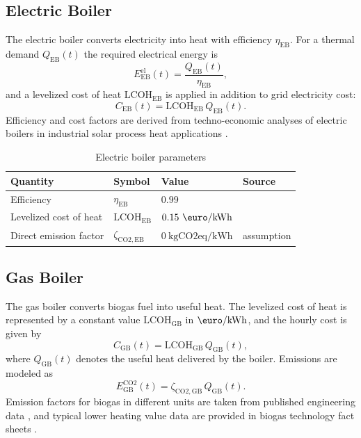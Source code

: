 \documentclass[12pt,a4paper]{report}
\begin{document}
\subsection{Electric Boiler}
\label{subsec:electric_boiler}

The electric boiler converts electricity into heat with efficiency \(\eta_{\mathrm{EB}}\). For a thermal demand \(Q_{\mathrm{EB}}(t)\) the required electrical energy is
\begin{equation}
E_{\mathrm{EB}}^{\mathrm{el}}(t) = \frac{Q_{\mathrm{EB}}(t)}{\eta_{\mathrm{EB}}},
\label{eq:electric_boiler_power}
\end{equation}
and a levelized cost of heat \(\mathrm{LCOH}_{\mathrm{EB}}\) is applied in addition to grid electricity cost:
\begin{equation}
C_{\mathrm{EB}}(t) = \mathrm{LCOH}_{\mathrm{EB}}\,Q_{\mathrm{EB}}(t).
\label{eq:electric_boiler_cost}
\end{equation}
Efficiency and cost factors are derived from techno-economic analyses of electric boilers in industrial solar process heat applications \cite{caron_ship4d_2025}.  

\begin{table}[H]
\centering
\caption{Electric boiler parameters}
\label{tab:electric_boiler_parameters}
\begin{tabular}{llll}
\hline
Quantity & Symbol & Value & Source \\
\hline
Efficiency & \(\eta_{\mathrm{EB}}\) & \(0.99\) & \cite{caron_ship4d_2025} \\
Levelized cost of heat & \(\mathrm{LCOH}_{\mathrm{EB}}\) & \(0.15~\mathrm{\text{\euro}/kWh}\) & \cite{caron_ship4d_2025} \\
Direct emission factor & \(\zeta_{\mathrm{CO2,EB}}\) & \(0~\mathrm{kgCO2eq/kWh}\) & assumption \\
\hline
\end{tabular}
\end{table}

\subsection{Gas Boiler}
\label{subsec:gas_boiler}

The gas boiler converts biogas fuel into useful heat. The levelized cost of heat is represented by a constant value \(\mathrm{LCOH}_{\mathrm{GB}}\) in \(\mathrm{\text{\euro}/kWh}\), and the hourly cost is given by
\begin{equation}
C_{\mathrm{GB}}(t) = \mathrm{LCOH}_{\mathrm{GB}}\,Q_{\mathrm{GB}}(t),
\label{eq:gas_boiler_cost}
\end{equation}
where \(Q_{\mathrm{GB}}(t)\) denotes the useful heat delivered by the boiler. Emissions are modeled as
\begin{equation}
E_{\mathrm{GB}}^{\mathrm{CO2}}(t) = \zeta_{\mathrm{CO2,GB}}\,Q_{\mathrm{GB}}(t).
\label{eq:gas_boiler_emissions}
\end{equation}
Emission factors for biogas in different units are taken from published engineering data \cite{winnipeg_biogas_2012}, and typical lower heating value data are provided in biogas technology fact sheets \cite{f3centre_biogas_2024}.  
\end{document}
